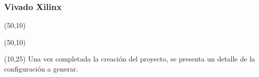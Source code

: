 \documentclass[aspectratio=169]{beamer}
\begin{document}
\begin{frame}[fragile,t]
    \frametitle{Vivado Xilinx}
    \begin{textblock}{75}(50,10)  \end{textblock}
    \begin{textblock}{75}(50,10)  \end{textblock}
    \begin{textblock}{38}(10,25) \small
     Una vez completada la creación del proyecto, se presenta un detalle de la configuración a generar.
    \end{textblock}
\end{frame}
    
\end{document}
